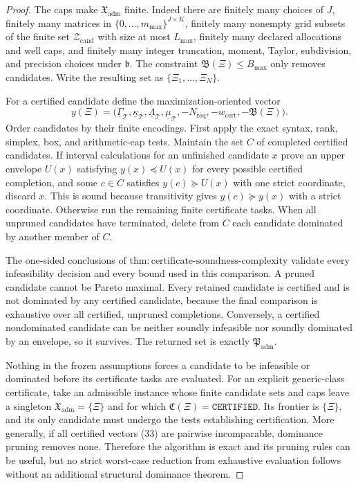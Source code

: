 \documentclass{article}
\begin{document}
\begin{proof}
The caps make \(\mathfrak X_{\mathrm{adm}}\) finite.  Indeed there are finitely many choices of \(J\), finitely many matrices in \(\{0,\ldots,m_{\max}\}^{J\times K}\), finitely many nonempty grid subsets of the finite set \(\mathcal Z_{\mathrm{cand}}\) with size at most \(L_{\max}\), finitely many declared allocations and well caps, and finitely many integer truncation, moment, Taylor, subdivision, and precision choices under \(\mathfrak b\).  The constraint \(\mathfrak B(\Xi)\leq B_{\max}\) only removes candidates.  Write the resulting set as \(\{\Xi_1,\ldots,\Xi_N\}\).

For a certified candidate define the maximization-oriented vector
\[
 y(\Xi)=\bigl(\underline\Gamma_{\mathcal T},
 \underline\kappa_{\mathcal T},
 \underline\Lambda_{\mathcal T},
 \underline\mu_{\mathcal T},
 -N_{\mathrm{req}},-w_{\mathrm{cert}},-\mathfrak B(\Xi)\bigr). \tag{33}
\]
Order candidates by their finite encodings.  First apply the exact syntax, rank, simplex, box, and arithmetic-cap tests.  Maintain the set \(C\) of completed certified candidates.  If interval calculations for an unfinished candidate \(x\) prove an upper envelope \(U(x)\) satisfying \(y(x)\preceq U(x)\) for every possible certified completion, and some \(c\in C\) satisfies \(y(c)\succeq U(x)\) with one strict coordinate, discard \(x\).  This is sound because transitivity gives \(y(c)\succeq y(x)\) with a strict coordinate.  Otherwise run the remaining finite certificate tasks.  When all unpruned candidates have terminated, delete from \(C\) each candidate dominated by another member of \(C\).

The one-sided conclusions of \(\mathrm{thm{:}certificate\text{-}soundness\text{-}complexity}\) validate every infeasibility decision and every bound used in this comparison.  A pruned candidate cannot be Pareto maximal.  Every retained candidate is certified and is not dominated by any certified candidate, because the final comparison is exhaustive over all certified, unpruned completions.  Conversely, a certified nondominated candidate can be neither soundly infeasible nor soundly dominated by an envelope, so it survives.  The returned set is exactly \(\mathfrak P_{\mathrm{adm}}\).

Nothing in the frozen assumptions forces a candidate to be infeasible or dominated before its certificate tasks are evaluated.  For an explicit generic-class certificate, take an admissible instance whose finite candidate sets and caps leave a singleton \(\mathfrak X_{\mathrm{adm}}=\{\Xi\}\) and for which \(\mathfrak C(\Xi)=\mathtt{CERTIFIED}\).  Its frontier is \(\{\Xi\}\), and its only candidate must undergo the tests establishing certification.  More generally, if all certified vectors (33) are pairwise incomparable, dominance pruning removes none.  Therefore the algorithm is exact and its pruning rules can be useful, but no strict worst-case reduction from exhaustive evaluation follows without an additional structural dominance theorem.
\end{proof}
\end{document}
